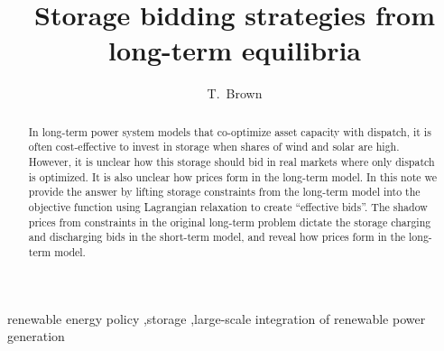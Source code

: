 \documentclass[final,3p,times]{elsarticle}
\begin{document}
\begin{frontmatter}





\title{Storage bidding strategies from long-term equilibria}



\author[kit]{T.~Brown}



\address[kit]{Institute for Automation and Applied Informatics, Karlsruhe Institute of Technology, Hermann-von-Helmholtz-Platz 1, 76344 Eggenstein-Leopoldshafen, Germany}


\begin{abstract}
  In long-term power system models that co-optimize asset capacity with
  dispatch, it is often cost-effective to invest in storage when
  shares of wind and solar are high. However, it is unclear how
  this storage should bid in real markets where only dispatch is
  optimized. It is also unclear how prices form in the long-term model.
  In this note we provide the answer by lifting storage
  constraints from the long-term model into the objective function using
  Lagrangian relaxation to create ``effective bids''.
  The shadow prices from constraints in the
  original long-term problem dictate the storage charging and discharging bids in the short-term model, and reveal how prices form in the long-term model.
\end{abstract}


\begin{keyword}
 renewable energy policy \sep storage \sep large-scale integration of renewable power generation



\end{keyword}

\end{frontmatter}
\end{document}
